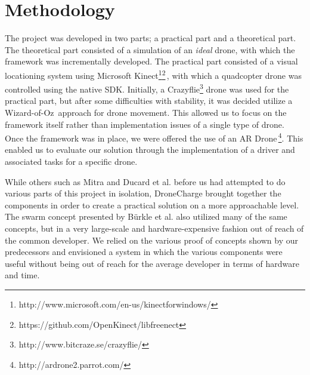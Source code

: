 \section{Methodology}
The project was developed in two parts; a practical part and a theoretical part. The theoretical part consisted of a simulation of an \textit{ideal} drone, with which the framework was incrementally developed. The practical part consisted of a visual locationing system using Microsoft Kinect\footnote{http://www.microsoft.com/en-us/kinectforwindows/}\footnote{https://github.com/OpenKinect/libfreenect}\,\cite{benavidez2011mobile}, with which a quadcopter drone was controlled using the native SDK. Initially, a Crazyflie\footnote{http://www.bitcraze.se/crazyflie/} drone was used for the practical part, but after some difficulties with stability, it was decided utilize a Wizard-of-Oz\,\cite{kelley1984iterative} approach for drone movement. This allowed us to focus on the framework itself rather than implementation issues of a single type of drone. Once the framework was in place, we were offered the use of an AR Drone\,\footnote{http://ardrone2.parrot.com/}. This enabled us to evaluate our solution through the implementation of  a driver and associated tasks for a specific drone.

While others such as Mitra and Ducard et al. before us had attempted to do various parts of this project in isolation, DroneCharge brought together the components in order to create a practical solution on a more approachable level. The swarm concept presented by B\"urkle et al. also utilized many of the same concepts, but in a very large-scale and hardware-expensive fashion out of reach of the common developer. We relied on the various proof of concepts shown by our predecessors and envisioned a system in which the various components were useful without being out of reach for the average developer in terms of hardware and time.